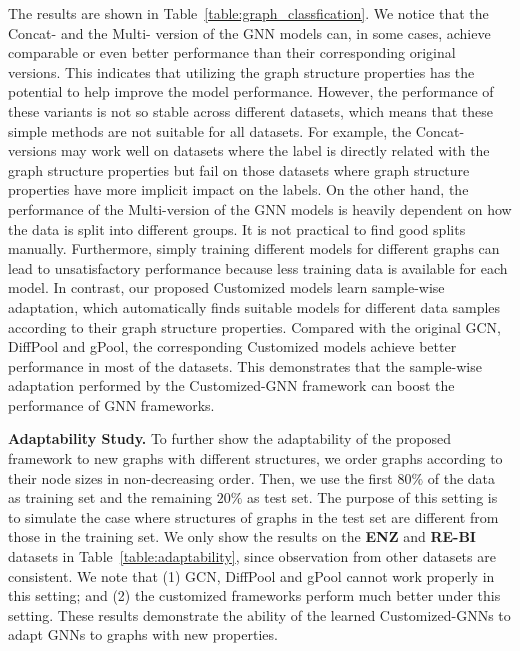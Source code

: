\documentclass[11pt,dvipdfm]{article}
\begin{document}
The results are shown in Table~\ref{table:graph_classfication}. We notice that the Concat- and the Multi- version of the GNN models can, in some cases, achieve comparable or even better performance than their corresponding original versions. This indicates that utilizing the graph structure properties has the potential to help improve the model performance. However, the performance of these variants is not so stable across different datasets, which means that these simple methods are not suitable for all datasets. For example, the Concat- versions may work well on datasets where the label is directly related with the graph structure properties but fail on those datasets where graph structure properties have more implicit impact on the labels. On the other hand, the performance of the Multi-version of the GNN models is heavily dependent on how the data is split into different groups. It is not practical to find good splits manually. Furthermore, simply training different models for different graphs can lead to unsatisfactory performance because less training data is available for each model. In contrast, our proposed Customized models learn sample-wise adaptation, which automatically finds suitable models for different data samples according to their graph structure properties. Compared with the original GCN, DiffPool and gPool, the corresponding Customized models achieve better performance in most of the datasets. This demonstrates that the sample-wise adaptation performed by the Customized-GNN framework can boost the performance of GNN frameworks. 







{\bf Adaptability Study.} To further show the adaptability of the proposed framework to new graphs with different structures, we order graphs according to their node sizes in non-decreasing order. Then, we use the first $80\%$ of the data as training set and the remaining $20\%$ as test set. The purpose of this setting is to simulate the case where structures of graphs in the test set are different from those in the training set. We only show the results on the \textbf{ENZ} and \textbf{RE-BI} datasets in Table~\ref{table:adaptability}, since observation from other datasets are consistent. We note that (1) GCN, DiffPool and gPool cannot work properly in this setting; and (2) the customized frameworks perform much better under this setting. These results demonstrate the ability of the learned Customized-GNNs to adapt GNNs to graphs with new properties.  
\end{document}
